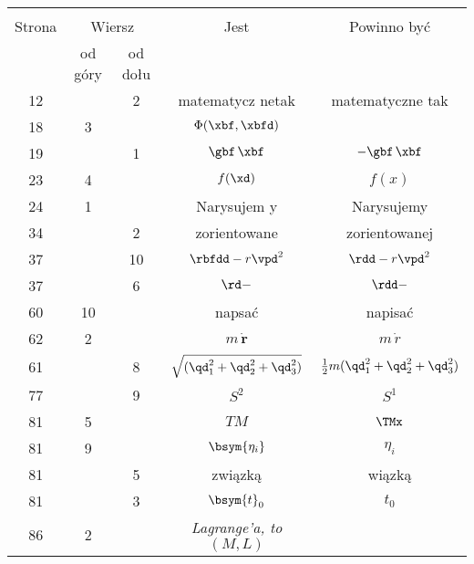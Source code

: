 \documentclass[a4paper,11pt]{article}
\begin{document}

\begin{center}
  \begin{tabular}{|c|c|c|c|c|}
    \hline
    & \multicolumn{2}{c|}{} & & \\
    Strona & \multicolumn{2}{c|}{Wiersz} & Jest
                              & Powinno być \\ \cline{2-3}
    & od góry & od dołu & & \\
    \hline
    12  & &  2 & matematycz netak & matematyczne tak \\
    18  &  3 & & $\Phi( \xbf, \xbfd )$
           & %
    \\ 
    19  & &  1 & $\gbf\, \xbf$ & $- \gbf\, \xbf$ \\
    23  &  4 & & $f( \xd )$ & $f( x )$ \\
    24  &  1 & & Narysujem y & Narysujemy \\
    34  & &  2 & zorientowane & zorientowanej \\
    37  & & 10 & $\rbfdd - r \vpd^{ 2 }$ & $\rdd - r \vpd^{ 2 }$ \\
    37  & &  6 & $\rd -$ & $\rdd -$ \\
    60  & 10 & & napsać & napisać \\
    62  &  2 & & $m\, \dot{ \mathbf{r} }$ & $m\, \dot{ r }$ \\
    61  & &  8 & $\sqrt{ ( \qd_{ 1 }^{ 2 } + \qd_{ 2 }^{ 2 }
                 + \qd_{ 3 }^{ 2 } ) }$
           & $\frac{ 1 }{ 2 } m ( \qd_{ 1 }^{ 2 } + \qd_{ 2 }^{ 2 }
             + \qd_{ 3 }^{ 2 } )$ \\
    77  & &  9 & $S^{ 2 }$ & $S^{ 1 }$ \\
    81  &  5 & & $TM$ & $\TMx$ \\
    81  &  9 & & $\bsym{ \eta_{ i } }$ & $\eta_{ i }$ \\
    81  & &  5 & związką & wiązką \\
    81  & &  3 & $\bsym{t}_{ 0 }$ & $t_{ 0 }$ \\
    86  &  2 & & \emph{Lagrange'a, to $( M, L )$}

\end{tabular}
\end{center}
\end{document}
